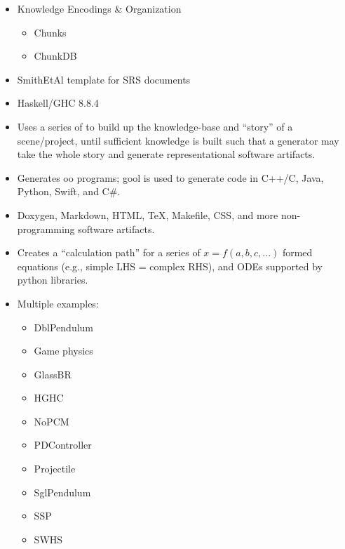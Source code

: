 \begin{itemize}

    \item Knowledge Encodings \& Organization
          \begin{itemize}
              \item Chunks
              \item ChunkDB
          \end{itemize}

    \item SmithEtAl template for SRS documents

    \item Haskell/GHC 8.8.4

    \item Uses a series of  to build up the knowledge-base and
          ``story'' of a scene/project, until sufficient knowledge is built such
          that a generator may take the whole story and generate
          representational software artifacts.

    \item Generates \acs{oo} programs; \acs{gool} is used to generate code in
          C++/C, Java, Python, Swift, and C\#.

    \item Doxygen, Markdown, HTML, TeX, Makefile, CSS, and more non-programming
          software artifacts.

    \item Creates a ``calculation path'' for a series of $x = f(a,b,c,...)$
          formed equations (e.g., simple LHS = complex RHS), and ODEs supported
          by python libraries.

    \item Multiple examples:
          \begin{itemize}
              \item DblPendulum
              \item Game physics
              \item GlassBR
              \item HGHC
              \item NoPCM
              \item PDController
              \item Projectile
              \item SglPendulum
              \item SSP
              \item SWHS
          \end{itemize}


\end{itemize}
